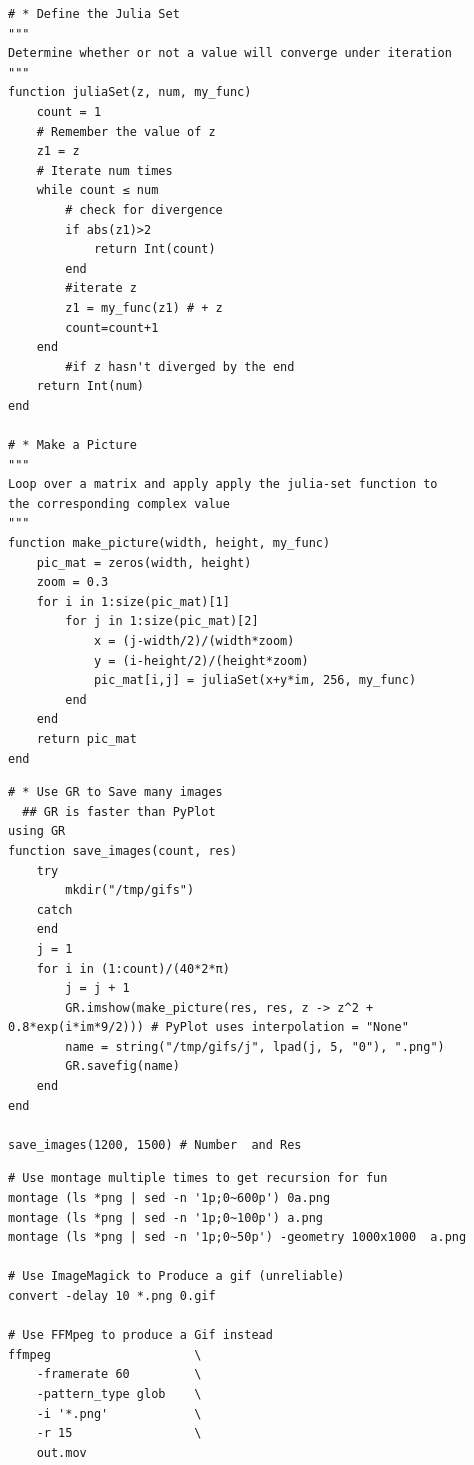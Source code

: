 \documentclass[a4paper,11pt,twoside]{article}
\begin{document}
\begin{listing}[htbp]
\begin{verbatim}
# * Define the Julia Set
"""
Determine whether or not a value will converge under iteration
"""
function juliaSet(z, num, my_func)
    count = 1
    # Remember the value of z
    z1 = z
    # Iterate num times
    while count ≤ num
        # check for divergence
        if abs(z1)>2
            return Int(count)
        end
        #iterate z
        z1 = my_func(z1) # + z
        count=count+1
    end
        #if z hasn't diverged by the end
    return Int(num)
end

# * Make a Picture
"""
Loop over a matrix and apply apply the julia-set function to
the corresponding complex value
"""
function make_picture(width, height, my_func)
    pic_mat = zeros(width, height)
    zoom = 0.3
    for i in 1:size(pic_mat)[1]
        for j in 1:size(pic_mat)[2]
            x = (j-width/2)/(width*zoom)
            y = (i-height/2)/(height*zoom)
            pic_mat[i,j] = juliaSet(x+y*im, 256, my_func)
        end
    end
    return pic_mat
end

\end{verbatim}
\caption{\label{julia-gen-fracs}Produce a series of fractals using julia}
\end{listing}

\begin{listing}[htbp]
\begin{verbatim}
# * Use GR to Save many images
  ## GR is faster than PyPlot
using GR
function save_images(count, res)
    try
        mkdir("/tmp/gifs")
    catch
    end
    j = 1
    for i in (1:count)/(40*2*π)
        j = j + 1
        GR.imshow(make_picture(res, res, z -> z^2 + 0.8*exp(i*im*9/2))) # PyPlot uses interpolation = "None"
        name = string("/tmp/gifs/j", lpad(j, 5, "0"), ".png")
        GR.savefig(name)
    end
end

save_images(1200, 1500) # Number  and Res
\end{verbatim}
\caption{\label{GR-save}Generate and save the images with GR}
\end{listing}

\begin{listing}[htbp]
\begin{verbatim}
# Use montage multiple times to get recursion for fun
montage (ls *png | sed -n '1p;0~600p') 0a.png
montage (ls *png | sed -n '1p;0~100p') a.png
montage (ls *png | sed -n '1p;0~50p') -geometry 1000x1000  a.png

# Use ImageMagick to Produce a gif (unreliable)
convert -delay 10 *.png 0.gif

# Use FFMpeg to produce a Gif instead
ffmpeg                    \
    -framerate 60         \
    -pattern_type glob    \
    -i '*.png'            \
    -r 15                 \
    out.mov


\end{verbatim}
\caption{\label{bash-frac-join}Using \texttt{bash}, \texttt{ffmpeg} and \emph{ImageMagick} to combine the images and produce an animation.}
\end{listing}
\end{document}
